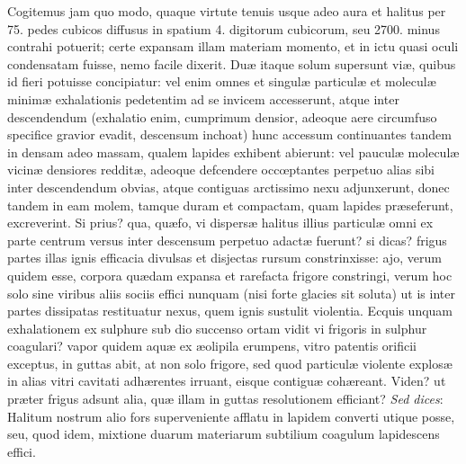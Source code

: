 \documentclass[a4paper, 11pt, oneside, polutonikogreek, latin]{article}
\begin{document}
Cogitemus jam quo modo, quaque virtute tenuis usque adeo aura et halitus per 75. pedes cubicos diffusus in spatium 4. digitorum cubicorum, seu 2700. minus contrahi potuerit; certe expansam illam materiam momento, et in ictu quasi oculi condensatam fuisse, nemo facile dixerit. Duæ itaque solum supersunt viæ, quibus id fieri potuisse concipiatur: vel enim omnes et singulæ particulæ et moleculæ minimæ exhalationis pedetentim ad se invicem accesserunt, atque inter descendendum (exhalatio enim, cumprimum densior, adeoque aere circumfuso specifice gravior evadit, descensum inchoat) hunc accessum continuantes tandem in densam adeo massam, qualem lapides exhibent abierunt: vel pauculæ moleculæ vicinæ densiores redditæ, adeoque defcendere occœptantes perpetuo alias sibi inter descendendum obvias, atque contiguas arctissimo nexu adjunxerunt, donec tandem in eam molem, tamque duram et compactam, quam lapides præseferunt, excreverint. Si prius? qua, quæfo, vi dispersæ halitus illius particulæ omni ex parte centrum versus inter descensum perpetuo adactæ fuerunt? si dicas? frigus partes illas ignis efficacia divulsas et disjectas rursum constrinxisse: ajo, verum quidem esse, corpora quædam expansa et rarefacta frigore constringi, verum hoc solo sine viribus aliis sociis effici nunquam (nisi forte glacies sit soluta) ut is inter partes dissipatas restituatur nexus, quem ignis sustulit violentia. Ecquis unquam exhalationem ex sulphure sub dio succenso ortam vidit vi frigoris in sulphur coagulari? vapor quidem aquæ ex æolipila erumpens, vitro patentis orificii exceptus, in guttas abit, at non solo frigore, sed quod particulæ violente explosæ in alias vitri cavitati adhærentes irruant, eisque contiguæ cohæreant. Viden? ut præter frigus adsunt alia, quæ illam in guttas resolutionem efficiant? \emph{Sed dices}: Halitum nostrum alio fors superveniente afflatu in lapidem converti utique posse, seu, quod idem, mixtione duarum materiarum subtilium coagulum lapidescens effici.
\end{document}
